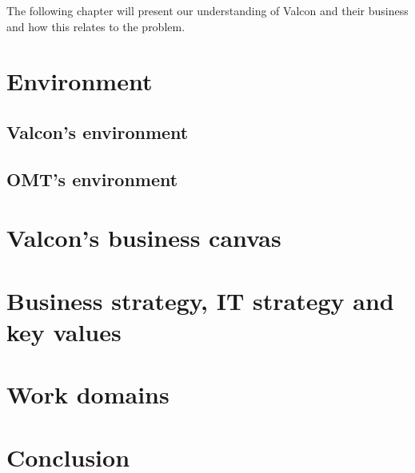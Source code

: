 The following chapter will present our understanding of Valcon and their business and how this relates to the problem. 

\section{Environment}
 
\subsection{Valcon's environment}

\subsection{OMT's environment}

\section{Valcon's business canvas}

\section{Business strategy, IT strategy and key values}

\section{Work domains}

\section{Conclusion}
